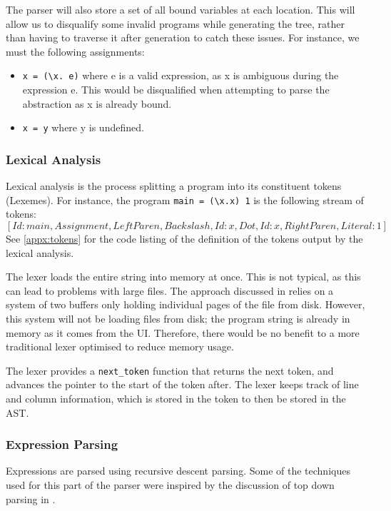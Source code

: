 The parser will also store a set of all bound variables at each location. This will allow us to disqualify some invalid programs while generating the tree, rather than having to traverse it after generation to catch these issues. For instance, we must the following assignments:
\begin{itemize}
    \item \verb|x = (\x. e)| where e is a valid expression, as x is ambiguous during the expression e. This would be disqualified when attempting to parse the abstraction as x is already bound.  
    \item \verb|x = y| where y is undefined.
\end{itemize}

\subsubsection{Lexical Analysis}
Lexical analysis is the process splitting a program into its constituent tokens (Lexemes). For instance, the program \verb|main = (\x.x) 1| is the following stream of tokens: \[[Id: main, Assignment, LeftParen, Backslash, Id: x, Dot, Id: x, RightParen, Literal: 1]\]
See \ref{appx:tokens} for the code listing of the definition of the tokens output by the lexical analysis.

The lexer loads the entire string into memory at once. This is not typical, as this can lead to problems with large files. The approach discussed in \cite{dragon_book} relies on a system of two buffers only holding individual pages of the file from disk. However, this system will not be loading files from disk; the program string is already in memory as it comes from the UI. Therefore, there would be no benefit to a more traditional lexer optimised to reduce memory usage. 

The lexer provides a \verb|next_token| function that returns the next token, and advances the pointer to the start of the token after. The lexer keeps track of line and column information, which is stored in the token to then be stored in the AST. 

\subsubsection{Expression Parsing}
Expressions are parsed using recursive descent parsing. Some of the techniques used for this part of the parser were inspired by the discussion of top down parsing in \cite{dragon_book}. 

